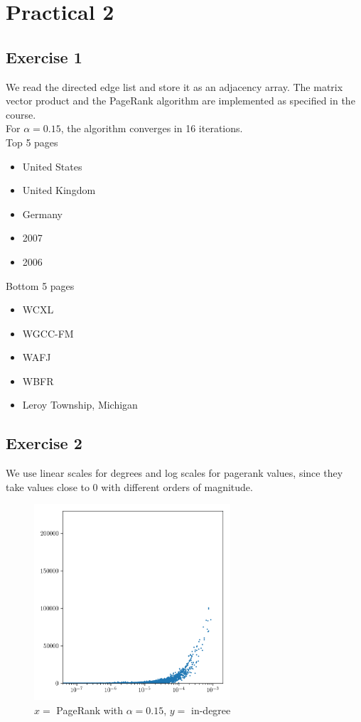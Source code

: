\documentclass{article}
\begin{document}
\section*{Practical 2}%
\label{sec:tp2}
\subsection*{Exercise 1}%
\label{sub:tp2ex1}
We read the directed edge list and store it as an adjacency array.
The matrix vector product and the PageRank algorithm are implemented as
specified in the course.\\
For $\alpha = 0.15$, the algorithm converges in 16 iterations.\\
Top 5 pages
\begin{itemize}
    \item United States
    \item United Kingdom
    \item Germany
    \item 2007
    \item 2006
\end{itemize}
Bottom 5 pages
\begin{itemize}
    \item WCXL
    \item WGCC-FM
    \item WAFJ
    \item WBFR
    \item Leroy Township, Michigan
\end{itemize}

\subsection*{Exercise 2}%
\label{sub:tp2ex2}
We use linear scales for degrees and log scales for pagerank values, since they
take values close to 0 with different orders of magnitude.

\begin{figure}[H]
    \centering
    \includegraphics[width=0.65\textwidth]{plots/1.png}
    \caption{$x =$ PageRank with $\alpha = 0.15$, $y = $ in-degree}
    \label{fig:1}
\end{figure}
\end{document}
